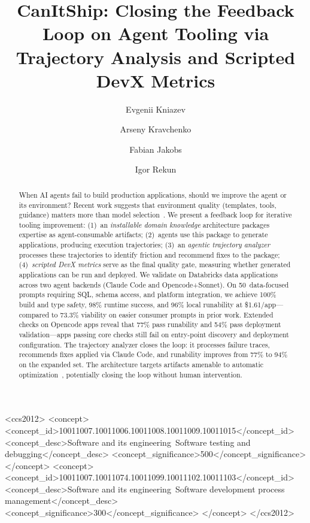 \documentclass[sigconf,review]{acmart}
\begin{document}
\title{CanItShip: Closing the Feedback Loop on Agent Tooling via Trajectory Analysis and Scripted DevX Metrics}

\author{Evgenii Kniazev}

\author{Arseny Kravchenko}

\author{Fabian Jakobs}

\author{Igor Rekun}

\begin{abstract}
When AI agents fail to build production applications, should we improve the agent or its environment? Recent work suggests that environment quality (templates, tools, guidance) matters more than model selection~\cite{kniazev2025appbuild}. We present a feedback loop for iterative tooling improvement: (1)~an \emph{installable domain knowledge} architecture packages expertise as agent-consumable artifacts; (2)~agents use this package to generate applications, producing execution trajectories; (3)~an \emph{agentic trajectory analyzer} processes these trajectories to identify friction and recommend fixes to the package; (4)~\emph{scripted DevX metrics} serve as the final quality gate, measuring whether generated applications can be run and deployed. We validate on Databricks data applications across two agent backends (Claude Code and Opencode+Sonnet). On 50~data-focused prompts requiring SQL, schema access, and platform integration, we achieve 100\% build and type safety, 98\% runtime success, and 96\% local runability at \$1.61/app---compared to 73.3\% viability on easier consumer prompts in prior work. Extended checks on Opencode apps reveal that 77\% pass runability and 54\% pass deployment validation---apps passing core checks still fail on entry-point discovery and deployment configuration. The trajectory analyzer closes the loop: it processes failure traces, recommends fixes applied via Claude Code, and runability improves from 77\% to 94\% on the expanded set. The architecture targets artifacts amenable to automatic optimization~\cite{gepa2025, khattab2023dspy}, potentially closing the loop without human intervention.
\end{abstract}

\begin{CCSXML}
<ccs2012>
   <concept>
       <concept_id>10011007.10011006.10011008.10011009.10011015</concept_id>
       <concept_desc>Software and its engineering~Software testing and debugging</concept_desc>
       <concept_significance>500</concept_significance>
   </concept>
   <concept>
       <concept_id>10011007.10011074.10011099.10011102.10011103</concept_id>
       <concept_desc>Software and its engineering~Software development process management</concept_desc>
       <concept_significance>300</concept_significance>
   </concept>
</ccs2012>
\end{CCSXML}
\end{document}
